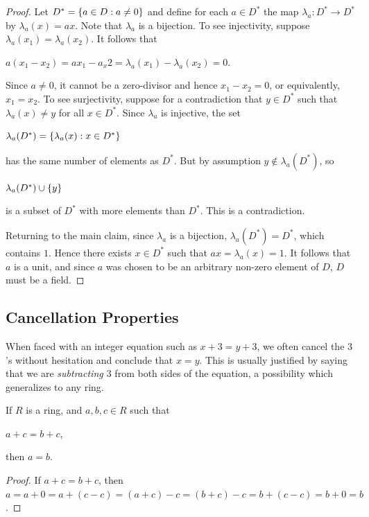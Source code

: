 \documentclass[11pt,fleqn,dvipsnames,usenames]{article}
\newcommand{\p}{\noindent}
\begin{document}
\begin{proof}
Let $D^{*} = \left\{a\in D:a\neq 0\right\}$ and define for each $a\in D^*$ the map $\lambda_{a}:D^{*}\to D^{*}$ by $\lambda_{a}(x) = ax$.  Note that $\lambda_{a}$ is a bijection.  To see injectivity, suppose $\lambda_{a}(x_{1}) = \lambda_{a}(x_{2})$.  It follows that
\begin{center}
$a(x_{1} - x_{2}) = ax_1 - a_x2 =  \lambda_{a}(x_{1}) - \lambda_{a}(x_{2}) = 0$.
\end{center}
Since $a\neq 0$, it cannot be a zero-divisor and hence $x_{1} - x_{2} = 0$, or equivalently, $x_{1} = x_{2}$.  To see surjectivity, suppose for a contradiction that $y\in D^{*}$ such that $\lambda_{a}(x)\neq y$ for all $x\in D^{*}$.  Since $\lambda_{a}$ is injective, the set
\begin{center}
$\lambda_{a}(D^{*}) = \left\{\lambda_{a}(x):x\in D^{*}\right\}$
\end{center}
has the same number of elements as $D^{*}$.  But by assumption $y\notin \lambda_{a}(D^{*})$, so
\begin{center}
$\lambda_{a}(D^{*})\cup \left\{y\right\}$
\end{center}
is a subset of $D^{*}$ with more elements than $D^{*}$.  This is a contradiction.
\vsp

\p Returning to the main claim, since $\lambda_{a}$ is a bijection, $\lambda_{a}(D^{*}) = D^{*}$, which contains $1$.  Hence there exists $x\in D^{*}$ such that $ax = \lambda_{a}(x) = 1$.  It follows that $a$ is a unit, and since $a$ was chosen to be an arbitrary non-zero element of $D$, $D$ must be a field.  
\end{proof}
\vsp

\subsection{Cancellation Properties}

\p When faced with an integer equation such as $x + 3 = y + 3$, we often cancel the $3$'s without hesitation and conclude that $x = y$.  This is usually justified by saying that we are \emph{subtracting $3$} from both sides of the equation, a possibility which generalizes to any ring.

\begin{theorem}\label{additivecancellation}
If $R$ is a ring, and $a,b,c\in R$ such that
\begin{center}
$a + c = b + c$,
\end{center}
then $a = b$.
\end{theorem}
%
\begin{proof}
If $a + c = b + c$, then $a = a + 0 = a + (c - c) = (a + c) - c = (b + c) - c = b + (c - c) = b+0 = b$.
\end{proof}
\end{document}
